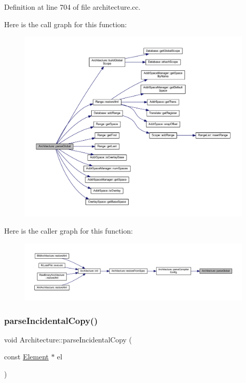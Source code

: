 Definition at line 704 of file architecture.\+cc.

Here is the call graph for this function\+:
\nopagebreak
\begin{figure}[H]
\begin{center}
\leavevmode
\includegraphics[width=350pt]{class_architecture_a6348f797097deb07776eca437458ecc8_cgraph}
\end{center}
\end{figure}
Here is the caller graph for this function\+:
\nopagebreak
\begin{figure}[H]
\begin{center}
\leavevmode
\includegraphics[width=350pt]{class_architecture_a6348f797097deb07776eca437458ecc8_icgraph}
\end{center}
\end{figure}
\mbox{\label{class_architecture_a8b2290f8d9cf479d4b49fb26c83ff8c5}} 
\subsubsection{\texorpdfstring{parseIncidentalCopy()}{parseIncidentalCopy()}}
{\footnotesize\ttfamily void Architecture\+::parse\+Incidental\+Copy (\begin{DoxyParamCaption}\item[{const \mbox{\hyperlink{class_element}{Element}} $\ast$}]{el }\end{DoxyParamCaption})\hspace{0.3cm}{\ttfamily [protected]}}



